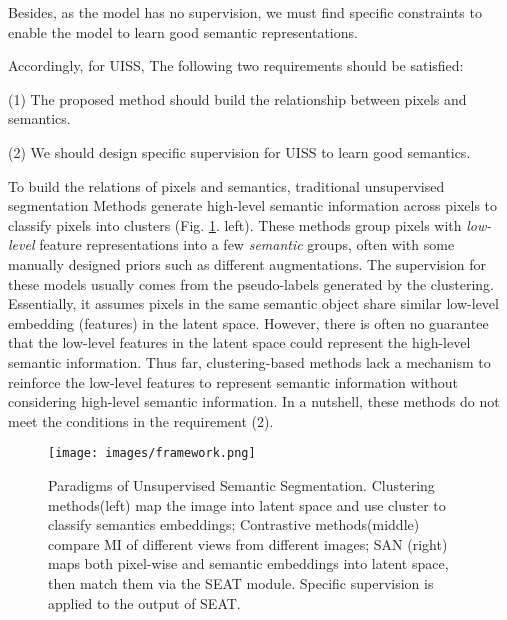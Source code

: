 \documentclass[letterpaper]{article} \usepackage{aaai23}  \usepackage{times}  \usepackage{helvet}  \usepackage{courier}  \usepackage[hyphens]{url}  \usepackage{graphicx} \urlstyle{rm} \def\UrlFont{\rm}  \usepackage{natbib}  \usepackage{caption} \frenchspacing  \setlength{\pdfpagewidth}{8.5in}  \setlength{\pdfpageheight}{11in}  \usepackage{algorithm}
\begin{document}
Besides, as the model has no supervision, we must find specific constraints to enable the model to learn good semantic representations. 

Accordingly, for UISS, The following two requirements should be satisfied: 

(1) The proposed method should build the relationship between pixels and semantics.

(2) We should design specific supervision for UISS to learn good semantics.

To build the relations of pixels and semantics, traditional unsupervised segmentation Methods\cite{caron2018deep} \cite{van2021unsupervised} generate high-level semantic information across pixels to classify pixels into clusters (Fig. \ref{frame}. left). These methods group pixels with \textit{low-level} feature representations into a few \textit{semantic} groups, often with some manually designed priors such as different augmentations. The supervision for these models usually comes from the pseudo-labels generated by the clustering. Essentially, it assumes pixels in the same semantic object share similar low-level embedding (features) in the latent space. However, there is often no guarantee that the low-level features in the latent space could represent the high-level semantic information. Thus far, clustering-based methods lack a mechanism to reinforce the low-level features to represent semantic information without considering high-level semantic information. In a nutshell, these methods do not meet the conditions in the requirement (2).

\begin{figure}[t]
\centering
\texttt{[image: images/framework.png]} \caption{{ Paradigms of Unsupervised Semantic Segmentation.} { Clustering methods}(left) map the image into latent space and use cluster to classify semantics embeddings;
  { Contrastive methods}(middle) compare MI of different views from different images;
  { SAN} (right) maps both pixel-wise and semantic embeddings into latent space, then match them via the SEAT module. Specific supervision is applied to the output of SEAT.}
\label{frame}
\end{figure}
\end{document}
